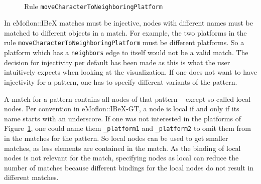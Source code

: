 \begin{figure}[h!]
	\centering
	 \\
	\caption{Rule \texttt{moveCharacterToNeighboringPlatform}}
	\label{fig:rule-moveCharacterToNeighboringPlatform}
\end{figure}

\noindent
In eMoflon::IBeX matches must be injective, \ie nodes with different names must be matched to different objects in a match. 
For example, the two platforms in the rule \texttt{moveCharacterToNeighboringPlatform} must be different platforms.
So a platform which has a \texttt{neighbors} edge to itself would not be a valid match.
The decision for injectivity per default has been made as this is what the user intuitively expects when looking at the visualization.
If one does not want to have injectivity for a pattern, one has to specify different variants of the pattern.

A match for a pattern contains all nodes of that pattern -- except so-called local nodes.
Per convention in eMoflon::IBeX-GT, a node is local if and only if its name starts with an underscore.
If one was not interested in the platforms of Figure~\ref{fig:rule-moveCharacterToNeighboringPlatform}, one could name them \texttt{\_platform1} and \texttt{\_platform2} to omit them from in the matches for the pattern.
So local nodes can be used to get smaller matches, as less elements are contained in the match.
As the binding of local nodes is not relevant for the match, specifying nodes as local can reduce the number of matches because different bindings for the local nodes do not result in different matches.

